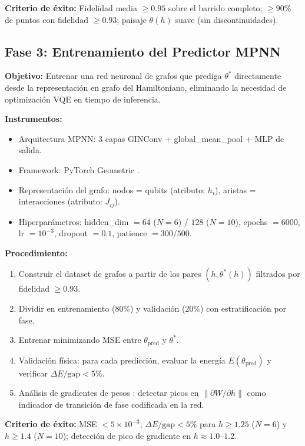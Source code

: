 \documentclass[11pt,a4paper,spanish]{book}
\begin{document}
\textbf{Criterio de éxito:} Fidelidad media $\geq 0.95$ sobre el barrido completo; $\geq 90\%$ de puntos con fidelidad $\geq 0.93$; paisaje $\theta(h)$ suave (sin discontinuidades).

\subsection{Fase 3: Entrenamiento del Predictor MPNN}

\textbf{Objetivo:} Entrenar una red neuronal de grafos que prediga $\theta^*$ directamente desde la representación en grafo del Hamiltoniano, eliminando la necesidad de optimización VQE en tiempo de inferencia.

\textbf{Instrumentos:}
\begin{itemize}
    \item Arquitectura MPNN: 3 capas GINConv \citep{xu2019} + global\_mean\_pool + MLP de salida.
    \item Framework: PyTorch Geometric \citep{fey2019}.
    \item Representación del grafo: nodos = qubits (atributo: $h_i$), aristas = interacciones (atributo: $J_{ij}$).
    \item Hiperparámetros: hidden\_dim $= 64$ ($N = 6$) / $128$ ($N = 10$), epochs $= 6000$, lr $= 10^{-3}$, dropout $= 0.1$, patience $= 300$/$500$.
\end{itemize}

\textbf{Procedimiento:}
\begin{enumerate}
    \item Construir el dataset de grafos a partir de los pares $(h, \theta^*(h))$ filtrados por fidelidad $\geq 0.93$.
    \item Dividir en entrenamiento (80\%) y validación (20\%) con estratificación por fase.
    \item Entrenar minimizando MSE entre $\theta_{\text{pred}}$ y $\theta^*$.
    \item Validación física: para cada predicción, evaluar la energía $E(\theta_{\text{pred}})$ y verificar $\Delta E/\text{gap} < 5\%$.
    \item Análisis de gradientes de pesos \citep{hernandes2025}: detectar picos en $\|\partial W / \partial h\|$ como indicador de transición de fase codificada en la red.
\end{enumerate}

\textbf{Criterio de éxito:} MSE $< 5 \times 10^{-3}$; $\Delta E/\text{gap} < 5\%$ para $h \geq 1.25$ ($N = 6$) y $h \geq 1.4$ ($N = 10$); detección de pico de gradiente en $h \approx 1.0$--$1.2$.
\end{document}
